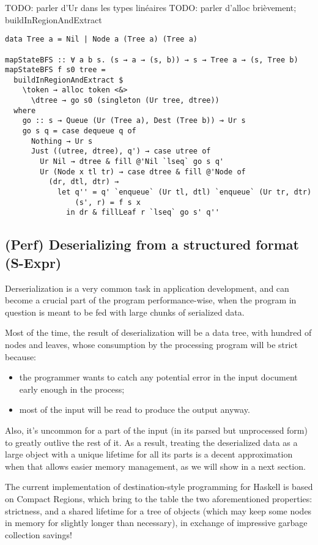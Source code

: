 \documentclass[english]{jflart}
\begin{document}
TODO: parler d'Ur dans les types linéaires
TODO: parler d'alloc brièvement; buildInRegionAndExtract

\begin{verbatim}
data Tree a = Nil | Node a (Tree a) (Tree a)

mapStateBFS :: ∀ a b s. (s → a → (s, b)) → s → Tree a → (s, Tree b)
mapStateBFS f s0 tree =
  buildInRegionAndExtract $
    \token → alloc token <&>
      \dtree → go s0 (singleton (Ur tree, dtree))
  where
    go :: s → Queue (Ur (Tree a), Dest (Tree b)) ⊸ Ur s
    go s q = case dequeue q of
      Nothing → Ur s
      Just ((utree, dtree), q') → case utree of
        Ur Nil → dtree & fill @'Nil `lseq` go s q'
        Ur (Node x tl tr) → case dtree & fill @'Node of
          (dr, dtl, dtr) →
            let q'' = q' `enqueue` (Ur tl, dtl) `enqueue` (Ur tr, dtr)
                (s', r) = f s x
              in dr & fillLeaf r `lseq` go s' q''
\end{verbatim}

\subsection{(Perf) Deserializing from a structured format (S-Expr)}

Derserialization is a very common task in application development, and can become a crucial part of the program performance-wise, when the program in question is meant to be fed with large chunks of serialized data.

Most of the time, the result of deserialization will be a data tree, with hundred of nodes and leaves, whose consumption by the processing program will be strict because:
\begin{itemize}
  \item the programmer wants to catch any potential error in the input document early enough in the process;
  \item most of the input will be read to produce the output anyway.
\end{itemize}

Also, it's uncommon for a part of the input (in its parsed but unprocessed form) to greatly outlive the rest of it. As a result, treating the deserialized data as a large object with a unique lifetime for all its parts is a decent  approximation when that allows easier memory management, as we will show in a next section.

The current implementation of destination-style programming for Haskell is based on Compact Regions, which bring to the table the two aforementioned properties: strictness, and a shared lifetime for a tree of objects (which may keep some nodes in memory for slightly longer than necessary), in exchange of impressive garbage collection savings!
\end{document}
